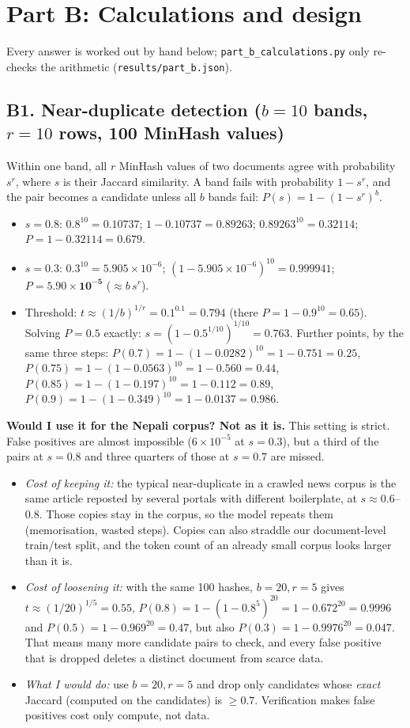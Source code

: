 \section{Part B: Calculations and design}
Every answer is worked out by hand below; \texttt{part\_b\_calculations.py} only re-checks the arithmetic (\texttt{results/part\_b.json}).

\subsection*{B1. Near-duplicate detection ($b=10$ bands, $r=10$ rows, 100 MinHash values)}
Within one band, all $r$ MinHash values of two documents agree with probability $s^r$, where $s$ is their Jaccard similarity. A band fails with probability $1-s^r$, and the pair becomes a candidate unless all $b$ bands fail:
$P(s)=1-(1-s^{r})^{b}$.
\begin{itemize}[leftmargin=*,nosep]
\item $s=0.8$: $0.8^{10}=0.10737$; $1-0.10737=0.89263$; $0.89263^{10}=0.32114$; $P=1-0.32114=\mathbf{0.679}$.
\item $s=0.3$: $0.3^{10}=5.905\times10^{-6}$; $(1-5.905\times10^{-6})^{10}=0.999941$; $P=\mathbf{5.90\times10^{-5}}$ ($\approx b\,s^r$).
\item Threshold: $t\approx(1/b)^{1/r}=0.1^{0.1}=\mathbf{0.794}$ (there $P=1-0.9^{10}=0.65$). Solving $P=0.5$ exactly: $s=(1-0.5^{1/10})^{1/10}=0.763$. Further points, by the same three steps: $P(0.7)=1-(1-0.0282)^{10}=1-0.751=0.25$, $P(0.75)=1-(1-0.0563)^{10}=1-0.560=0.44$, $P(0.85)=1-(1-0.197)^{10}=1-0.112=0.89$, $P(0.9)=1-(1-0.349)^{10}=1-0.0137=0.986$.
\end{itemize}
\textbf{Would I use it for the Nepali corpus? Not as it is.} This setting is strict. False positives are almost impossible ($6\times10^{-5}$ at $s=0.3$), but a third of the pairs at $s=0.8$ and three quarters of those at $s=0.7$ are missed.
\begin{itemize}[leftmargin=*,nosep]
\item \emph{Cost of keeping it:} the typical near-duplicate in a crawled news corpus is the same article reposted by several portals with different boilerplate, at $s\approx0.6$--$0.8$. Those copies stay in the corpus, so the model repeats them (memorisation, wasted steps). Copies can also straddle our document-level train/test split, and the token count of an already small corpus looks larger than it is.
\item \emph{Cost of loosening it:} with the same 100 hashes, $b=20,r=5$ gives $t\approx(1/20)^{1/5}=0.55$, $P(0.8)=1-(1-0.8^5)^{20}=1-0.672^{20}=0.9996$ and $P(0.5)=1-0.969^{20}=0.47$, but also $P(0.3)=1-0.9976^{20}=0.047$. That means many more candidate pairs to check, and every false positive that is dropped deletes a distinct document from scarce data.
\item \emph{What I would do:} use $b=20,r=5$ and drop only candidates whose \emph{exact} Jaccard (computed on the candidates) is $\ge0.7$. Verification makes false positives cost only compute, not data.
\end{itemize}
